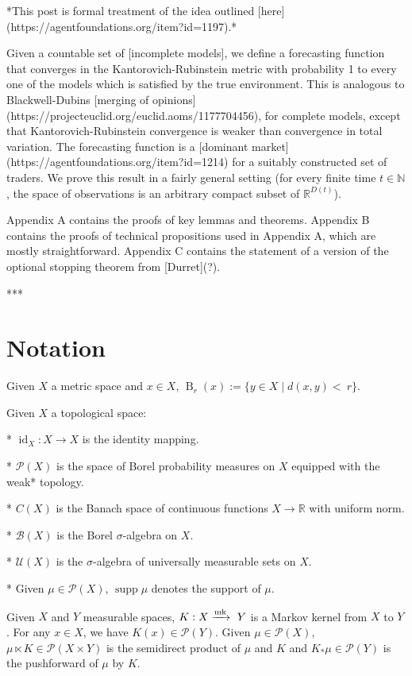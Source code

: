 \documentclass[a4paper]{article}
\DeclareMathOperator{\Supp}{supp}
\newcommand{\Nats}{\mathbb{N}}
\newcommand{\Reals}{\mathbb{R}}
\newcommand{\Markov}{\xrightarrow{\textnormal{mk}}}
\newcommand{\Prob}{\mathcal{P}}
\newcommand{\UM}{\mathcal{U}}
\newcommand{\I}{\operatorname{id}}
\newcommand{\Ball}{\operatorname{B}}
\begin{document}
*This post is formal treatment of the idea outlined [here](https://agentfoundations.org/item?id=1197).*

Given a countable set of [incomplete models], we define a forecasting function that converges in the Kantorovich-Rubinstein metric with probability 1 to every one of the models which is satisfied by the true environment. This is analogous to Blackwell-Dubins [merging of opinions](https://projecteuclid.org/euclid.aoms/1177704456), for complete models, except that Kantorovich-Rubinstein convergence is weaker than convergence in total variation. The forecasting function is a [dominant market](https://agentfoundations.org/item?id=1214) for a suitably constructed set of traders. We prove this result in a fairly general setting (for every finite time $t \in \Nats$, the space of observations is an arbitrary compact subset of $\Reals^{D(t)}$).%

Appendix A contains the proofs of key lemmas and theorems. Appendix B contains the proofs of technical propositions used in Appendix A, which are mostly straightforward. Appendix C contains the statement of a version of the optional stopping theorem from [Durret](?).

***

\section{Notation}

Given ${X}$ a metric space and ${x \in X}$, ${\Ball_r(x):=\{y \in X \mid d(x,y) <\ r\}}$.

Given ${X}$ a topological space:

* ${\I_X: X \rightarrow X}$ is the identity mapping.

* ${\Prob(X)}$ is the space of Borel probability measures on ${X}$ equipped with the weak* topology.

* ${C(X)}$ is the Banach space of continuous functions ${X \rightarrow \Reals}$ with uniform norm.

* ${\mathcal{B}}(X)$ is the Borel ${\sigma}$-algebra on ${X}$.

* ${\UM(X)}$ is the ${\sigma}$-algebra of universally measurable sets on ${X}$.

* Given ${\mu \in \Prob(X)}$, ${\Supp \mu}$ denotes the support of ${\mu}$. 

Given ${X}$ and ${Y}$ measurable spaces, ${K: X \Markov\ Y}$ is a Markov kernel from ${X}$ to ${Y}$. For any ${x \in X}$, we have ${K(x) \in \Prob(Y)}$. Given ${\mu \in \Prob(X)}$, ${\mu \ltimes K \in \Prob(X \times Y)}$ is the semidirect product of ${\mu}$ and ${K}$ and ${K_*\mu \in \Prob(Y)}$ is the pushforward of ${\mu}$ by ${K}$.
\end{document}
